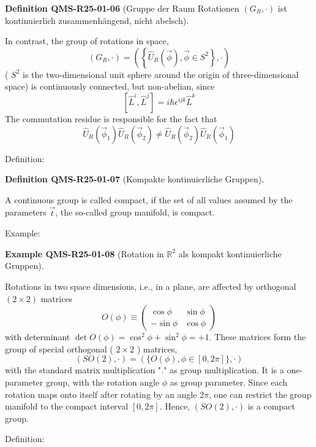 \documentclass[10pt, letterpaper]{article}
\newcommand{\R}{\mathbb{R}}
\newcommand{\CustomHeading}[3]{%
  \par\medskip\noindent%
  \textbf{#1 #2} \textnormal{(#3)}.\enskip%
}
\newenvironment{DEF}[2]{\begin{unitbox}\CustomHeading{Definition}{#1}{#2}}{\end{unitbox}}
\newenvironment{EXA}[2]{\begin{unitbox}\CustomHeading{Example}{#1}{#2}}{\end{unitbox}}
\begin{document}
\begin{DEF}{QMS-R25-01-06}{Gruppe der Raum Rotationen $(G_{R}, \cdot)$ ist kontinuierlich zusammenhängend, nicht abelsch}
In contrast, the group of rotations in space,
$$
\left(G_{R}, \cdot\right)=\left(\left\{\hat{U}_{R}(\vec{\phi}), \vec{\phi} \in S^{2}\right\}, \cdot\right)
$$
( $S^{2}$ is the two-dimensional unit sphere around the origin of three-dimensional space) is continuously connected, but non-abelian, since
$$
\left[\hat{L}^{i}, \hat{L}^{j}\right]=i \hbar \epsilon^{i j k} \hat{L}^{k}
$$
The commutation residue is responsible for the fact that
$$
\hat{U}_{R}\left(\vec{\phi}_{1}\right) \hat{U}_{R}\left(\vec{\phi}_{2}\right) \neq \hat{U}_{R}\left(\vec{\phi}_{2}\right) \hat{U}_{R}\left(\vec{\phi}_{1}\right)
$$
\end{DEF}



Definition: 

\begin{DEF}{QMS-R25-01-07}{Kompakte kontinuierliche Gruppen}
A continuous group is called compact, if the set of all values assumed by the parameters $\vec{t}$, the so-called group manifold, is compact.
\end{DEF}


Example: 

\begin{EXA}{QMS-R25-01-08}{Rotation in $\R^2$ als kompakt kontinuierliche Gruppen}
Rotations in two space dimensions, i.e., in a plane, are affected by orthogonal $(2 \times 2)$ matrices
$$
O(\phi) \equiv\left(\begin{array}{cc}
\cos \phi & \sin \phi \\
-\sin \phi & \cos \phi
\end{array}\right)
$$
with determinant $\operatorname{det} O(\phi)=\cos ^{2} \phi+\sin ^{2} \phi=+1$. These matrices form the group of special orthogonal ( $2 \times 2$ ) matrices,
$$
(S O(2), \cdot)=(\{O(\phi), \phi \in[0,2 \pi]\}, \cdot)
$$
with the standard matrix multiplication "." as group multiplication. It is a one-parameter group, with the rotation angle $\phi$ as group parameter. Since each rotation maps onto itself after rotating by an angle $2 \pi$, one can restrict the group manifold to the compact interval $[0,2 \pi]$. Hence, $(S O(2), \cdot)$ is a compact group.
\end{EXA}


Definition: 
\end{document}
